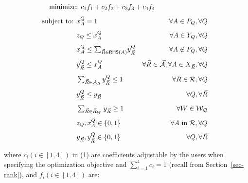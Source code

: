 {\begin{tcolorbox}
  \begin{alignat}{2}
\hspace{-1.25cm}\text{minimize: } & c_{1}f_{1}+c_{2}f_{2}+c_{3}f_{3}+c_{4}f_{4}~~~~~~~~  &  
  \end{alignat} 
  \begin{alignat}{2}
   \hspace*{-0.15cm}\text{subject to: }&  x_{A}^{Q} = 1 & \forall
    A\in P_{Q}, \forall Q \\[0.8ex] 
    & z_{Q}\leq x_{A}^{Q} & \forall A \in Y_{Q},\forall Q \\[0.8ex]
    & x_{A}^{Q} \leq\textstyle \sum_{\kb{R}\in \RHS(A)}\!y_{\kb{R}}^{Q} &~\forall
    A\not\in P_{Q}, \forall Q \\[0.8ex]
    & y_{\kb{R}}^{Q} \leq x_{A}^{Q} & \forall \kb{R}\in \kb{\A}, \forall A\in X_{\kb{R}}, \forall
    Q\\[0.8ex]
    & \textstyle \sum_{\kb{R}\in \A_{R}} y_{\kb{R}}^{Q} \leq 1 & 
    \forall R\in \R, \forall Q \\[0.8ex]
    & y_{\kb{R}}^{Q} \leq y_{\kb{R}} & \forall Q, \forall \kb{R} \\[0.8ex]
    & \textstyle\sum_{\kb{R}\in \kb{R}_{W}} y_{\kb{R}} \geq 1 & \forall W\in \Wc_{\Q} \\[0.8ex]
    & z_{Q}, x_{A}^{Q} \in \{0, 1\} & \forall
    A\text{ in }\R, \forall Q\\[0.8ex]
    & y_{\kb{R}}, y_{\kb{R}}^{Q} \in \{0, 1\} & \forall Q, \forall
    \kb{R} 
  \end{alignat} 
\end{tcolorbox}

\sstab
where $c_{i} (i\in[1, 4])$  in (1) are coefficients adjustable by the users when specifying the
optimization objective and $\sum_{i=1}^{4}c_{i} = 1$ (recall
from Section~\ref{sec-rank}), and $f_{i}(i\in [1, 4])$ are:

\begin{tcolorbox}
\end{tcolorbox}

}
